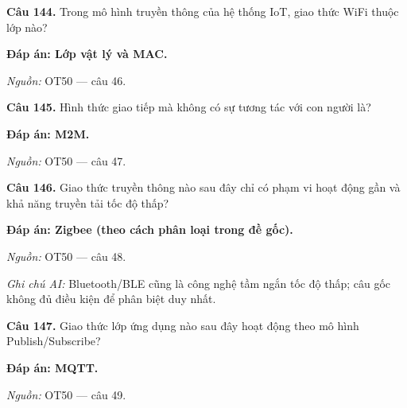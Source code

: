 \documentclass[11pt,a4paper]{article}
\begin{document}
\textbf{Câu 144.} Trong mô hình truyền thông của hệ thống IoT, giao thức WiFi thuộc lớp nào?\par
{\color{answer}\textbf{Đáp án: Lớp vật lý và MAC.}}\par
{\footnotesize\color{sourcegray}\textit{Nguồn:} OT50 — câu 46.\par}
\vspace{3pt}\par\noindent{\color{black!18}\rule{\linewidth}{0.3pt}}\par\medskip

\textbf{Câu 145.} Hình thức giao tiếp mà không có sự tương tác với con người là?\par
{\color{answer}\textbf{Đáp án: M2M.}}\par
{\footnotesize\color{sourcegray}\textit{Nguồn:} OT50 — câu 47.\par}
\vspace{3pt}\par\noindent{\color{black!18}\rule{\linewidth}{0.3pt}}\par\medskip

\textbf{Câu 146.} Giao thức truyền thông nào sau đây chỉ có phạm vi hoạt động gần và khả năng truyền tải tốc độ thấp?\par
{\color{answer}\textbf{Đáp án: Zigbee (theo cách phân loại trong đề gốc).}}\par
{\footnotesize\color{sourcegray}\textit{Nguồn:} OT50 — câu 48.\par}
{\footnotesize\color{sourcegray}\textit{Ghi chú AI:} Bluetooth/BLE cũng là công nghệ tầm ngắn tốc độ thấp; câu gốc không đủ điều kiện để phân biệt duy nhất.\par}
\vspace{3pt}\par\noindent{\color{black!18}\rule{\linewidth}{0.3pt}}\par\medskip

\textbf{Câu 147.} Giao thức lớp ứng dụng nào sau đây hoạt động theo mô hình Publish/Subscribe?\par
{\color{answer}\textbf{Đáp án: MQTT.}}\par
{\footnotesize\color{sourcegray}\textit{Nguồn:} OT50 — câu 49.\par}
\vspace{3pt}\par\noindent{\color{black!18}\rule{\linewidth}{0.3pt}}\par\medskip
\end{document}
